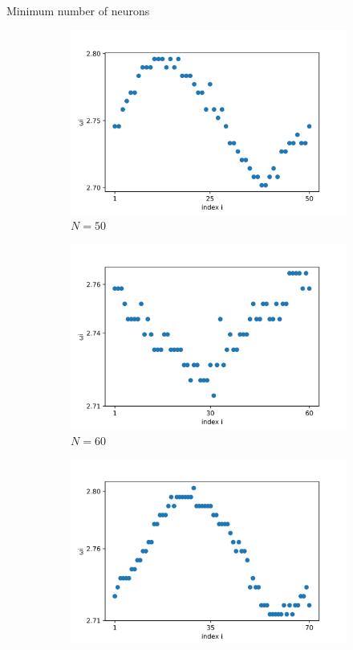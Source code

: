 \documentclass{beamer}
\begin{document}
\begin{frame}{Minimum number of neurons}
\begin{figure}[H]
\begin{subfigure}{.32\textwidth}
  \centering
  \includegraphics[width=1\linewidth]{w_N=50.png}  
  \caption{$N=50$}
\end{subfigure}
\hfill
\begin{subfigure}{.32\textwidth}
  \centering
  \includegraphics[width=1\linewidth]{w_N=60.png}  
  \caption{$N=60$}
\end{subfigure}
\hfill
\begin{subfigure}{.32\textwidth}
  \centering
  \includegraphics[width=1\linewidth]{w_N=70.png}  

\end{subfigure}
\end{figure}
\end{frame}
\end{document}
